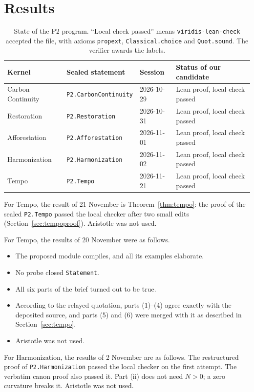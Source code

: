 \documentclass[11pt]{article}
\theoremstyle{definition}
\theoremstyle{remark}
\begin{document}
\section{Results}
\begin{table}[h]
\centering\small
\begin{tabular}{@{}llll@{}}
\toprule
Kernel & Sealed statement & Session & Status of our candidate \\
\midrule
Carbon Continuity & \texttt{P2.CarbonContinuity} & 2026-10-29 & Lean proof, local check passed \\
Restoration & \texttt{P2.Restoration} & 2026-10-31 & Lean proof, local check passed \\
Afforestation & \texttt{P2.Afforestation} & 2026-11-01 & Lean proof, local check passed \\
Harmonization & \texttt{P2.Harmonization} & 2026-11-02 & Lean proof, local check passed \\
Tempo & \texttt{P2.Tempo} & 2026-11-21 & Lean proof, local check passed \\
\bottomrule
\end{tabular}
\caption{State of the P2 program. ``Local check passed'' means \texttt{viridis-lean-check} accepted the file, with axioms
\texttt{propext}, \texttt{Classical.choice} and \texttt{Quot.sound}. The verifier awards the labels.}
\end{table}
For Tempo, the result of 21 November is Theorem~\ref{thm:tempo}: the proof of the sealed \texttt{P2.Tempo} passed the local checker
after two small edits (Section~\ref{sec:tempoproof}). Aristotle was not used.

For Tempo, the results of 20 November were as follows.
\begin{itemize}
\item The proposed module compiles, and all its examples elaborate.
\item No probe closed \texttt{Statement}.
\item All six parts of the brief turned out to be true.
\item According to the relayed quotation, parts (1)--(4) agree exactly with the deposited source, and parts (5) and (6) were merged with it as described in Section~\ref{sec:tempo}.
\item Aristotle was not used.
\end{itemize}

For Harmonization, the results of 2 November are as follows.
The restructured proof of \texttt{P2.Harmonization} passed the local checker on the first attempt.
The verbatim canon proof also passed it. Part (ii) does not need $N>0$; a zero curvature breaks it.
Aristotle was not used.
\end{document}
